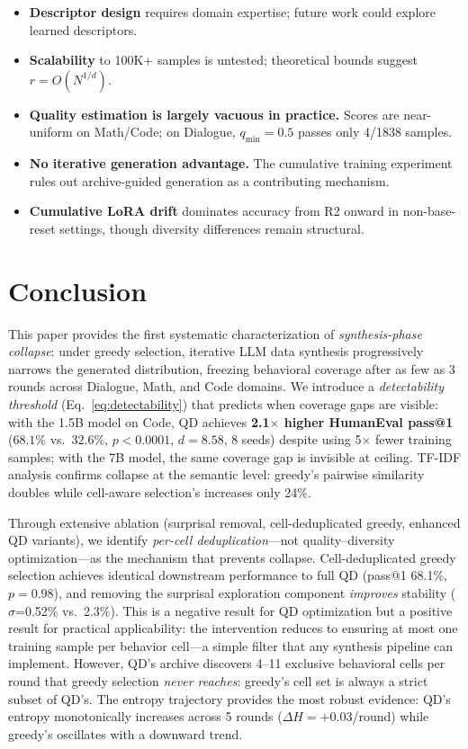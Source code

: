 \documentclass{article}
\begin{document}
\begin{enumerate}[nosep]
\begin{itemize}[nosep]
  \item \textbf{Descriptor design} requires domain expertise; future work could explore learned descriptors.
  \item \textbf{Scalability} to 100K+ samples is untested; theoretical bounds suggest $r = O(N^{1/d})$.
  \item \textbf{Quality estimation is largely vacuous in practice.} Scores are near-uniform on Math/Code; on Dialogue, $q_{\min}{=}0.5$ passes only 4/1838 samples.
  \item \textbf{No iterative generation advantage.} The cumulative training experiment rules out archive-guided generation as a contributing mechanism.
  \item \textbf{Cumulative LoRA drift} dominates accuracy from R2 onward in non-base-reset settings, though diversity differences remain structural.
\end{itemize}

\section{Conclusion}
\label{sec:conclusion}

This paper provides the first systematic characterization of \emph{synthesis-phase collapse}: under greedy selection, iterative LLM data synthesis progressively narrows the generated distribution, freezing behavioral coverage after as few as 3 rounds across Dialogue, Math, and Code domains.
We introduce a \emph{detectability threshold} (Eq.~\ref{eq:detectability}) that predicts when coverage gaps are visible: with the 1.5B model on Code, QD achieves \textbf{2.1$\times$ higher HumanEval pass@1} ($68.1\%$ vs.\ $32.6\%$, $p{<}0.0001$, $d{=}8.58$, 8 seeds) despite using 5$\times$ fewer training samples; with the 7B model, the same coverage gap is invisible at ceiling.
TF-IDF analysis confirms collapse at the semantic level: greedy's pairwise similarity doubles while cell-aware selection's increases only 24\%.

Through extensive ablation (surprisal removal, cell-deduplicated greedy, enhanced QD variants), we identify \emph{per-cell deduplication}---not quality--diversity optimization---as the mechanism that prevents collapse.
Cell-deduplicated greedy selection achieves identical downstream performance to full QD (pass@1 68.1\%, $p{=}0.98$), and removing the surprisal exploration component \emph{improves} stability ($\sigma$=0.52\% vs.\ 2.3\%).
This is a negative result for QD optimization but a positive result for practical applicability: the intervention reduces to ensuring at most one training sample per behavior cell---a simple filter that any synthesis pipeline can implement.
However, QD's archive discovers 4--11 exclusive behavioral cells per round that greedy selection \emph{never reaches}: greedy's cell set is always a strict subset of QD's.
The entropy trajectory provides the most robust evidence: QD's entropy monotonically increases across 5 rounds ($\Delta H{=}{+}0.03$/round) while greedy's oscillates with a downward trend.


\end{enumerate}
\end{document}
